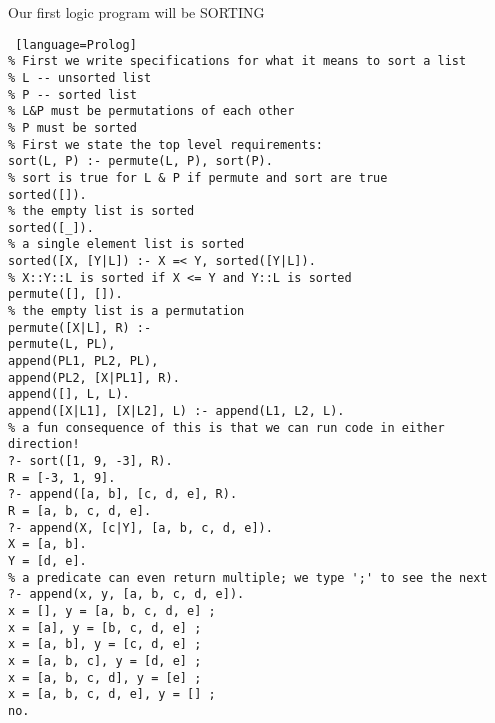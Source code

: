 \documentclass[../../lecture_notes.tex]{subfiles}
\begin{document}
Our first logic program will be SORTING
\begin{lstlisting} [language=Prolog]
% First we write specifications for what it means to sort a list
% L -- unsorted list
% P -- sorted list
% L&P must be permutations of each other
% P must be sorted
% First we state the top level requirements:
sort(L, P) :- permute(L, P), sort(P).
% sort is true for L & P if permute and sort are true
sorted([]).
% the empty list is sorted
sorted([_]).
% a single element list is sorted
sorted([X, [Y|L]) :- X =< Y, sorted([Y|L]).
% X::Y::L is sorted if X <= Y and Y::L is sorted
permute([], []).
% the empty list is a permutation
permute([X|L], R) :-
permute(L, PL),
append(PL1, PL2, PL),
append(PL2, [X|PL1], R).
append([], L, L).
append([X|L1], [X|L2], L) :- append(L1, L2, L).
% a fun consequence of this is that we can run code in either direction!
?- sort([1, 9, -3], R).
R = [-3, 1, 9].
?- append([a, b], [c, d, e], R).
R = [a, b, c, d, e].
?- append(X, [c|Y], [a, b, c, d, e]).
X = [a, b].	
Y = [d, e].
% a predicate can even return multiple; we type ';' to see the next
?- append(x, y, [a, b, c, d, e]).
x = [], y = [a, b, c, d, e] ;
x = [a], y = [b, c, d, e] ;
x = [a, b], y = [c, d, e] ;
x = [a, b, c], y = [d, e] ;
x = [a, b, c, d], y = [e] ;
x = [a, b, c, d, e], y = [] ;
no.
\end{lstlisting}
\end{document}
